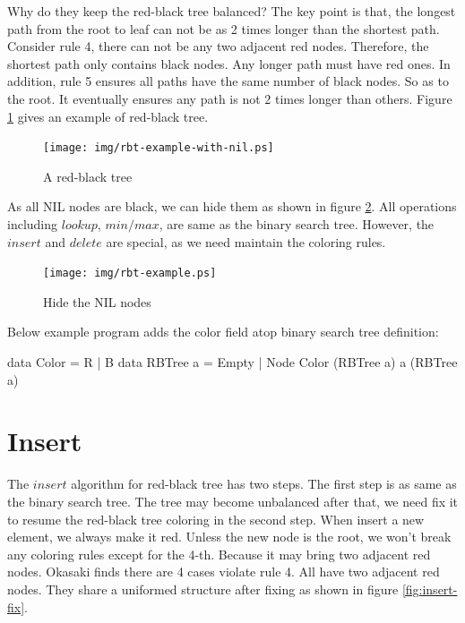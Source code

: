 \documentclass[b5paper]{article}
\begin{document}
Why do they keep the red-black tree balanced? The key point is that, the longest path from the root to leaf can not be as 2 times longer than the shortest path. Consider rule 4, there can not be any two adjacent red nodes. Therefore, the shortest path only contains black nodes. Any longer path must have red ones. In addition, rule 5 ensures all paths have the same number of black nodes. So as to the root. It eventually ensures any path is not 2 times longer than others\cite{wiki-rbt}. Figure \ref{fig:rbt-example-with-nil} gives an example of red-black tree.

\begin{figure}[htbp]
  \centering
  \texttt{[image: img/rbt-example-with-nil.ps]}
  \caption{A red-black tree}
  \label{fig:rbt-example-with-nil}
\end{figure}

As all NIL nodes are black, we can hide them as shown in figure \ref{fig:rbt-example}. All operations including $lookup$, $min/max$, are same as the binary search tree. However, the $insert$ and $delete$ are special, as we need maintain the coloring rules.

\begin{figure}[htbp]
  \centering
  \texttt{[image: img/rbt-example.ps]}
  \caption{Hide the NIL nodes}
  \label{fig:rbt-example}
\end{figure}

Below example program adds the color field atop binary search tree definition:

\begin{Haskell}
data Color = R | B
data RBTree a = Empty
              | Node Color (RBTree a) a (RBTree a)
\end{Haskell}

\begin{Exercise}
\end{Exercise}

\section{Insert}

The $insert$ algorithm for red-black tree has two steps. The first step is as same as the binary search tree. The tree may become unbalanced after that, we need fix it to resume the red-black tree coloring in the second step. When insert a new element, we always make it red. Unless the new node is the root, we won't break any coloring rules except for the 4-th. Because it may bring two adjacent red nodes. Okasaki finds there are 4 cases violate rule 4. All have two adjacent red nodes. They share a uniformed structure after fixing\cite{okasaki} as shown in figure \ref{fig:insert-fix}.
\end{document}
